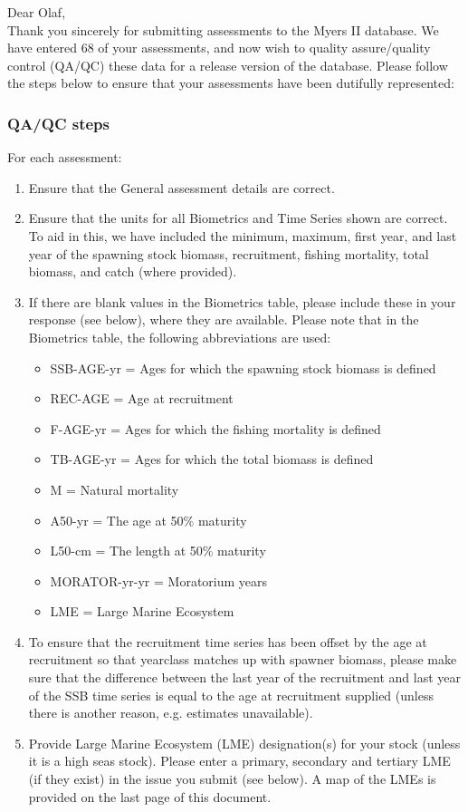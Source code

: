 \documentclass [a4paper, 10pt] {article}
\begin{document}
\noindent Dear Olaf,\\

\noindent Thank you sincerely for submitting assessments to the Myers II database. We have entered 68 of your assessments, and now wish to quality assure/quality control (QA/QC) these data for a release version of the database. Please follow the steps below to ensure that your assessments have been dutifully represented:
\subsubsection{QA/QC steps}
For each assessment:
\begin{enumerate}
\item Ensure that the General assessment details are correct.
\item Ensure that the units for all Biometrics and Time Series shown are correct. To aid in this, we have included the minimum, maximum, first year, and last year of the spawning stock biomass, recruitment, fishing mortality, total biomass, and  catch  (where provided). 
\item If there are blank values in the Biometrics table, please include these in your response (see below), where they are available.
Please note that in the Biometrics table, the following abbreviations are used:
\begin{itemize}
\item SSB-AGE-yr  = Ages for which the spawning stock biomass is defined
\item REC-AGE     = Age at recruitment
\item F-AGE-yr    = Ages for which the fishing mortality is defined 
\item TB-AGE-yr   = Ages for which the total biomass is defined
\item M      = Natural mortality
\item A50-yr      = The age at 50\% maturity
\item L50-cm      = The length at 50\% maturity
\item MORATOR-yr-yr = Moratorium years
\item LME = Large Marine Ecosystem\\
\end{itemize}
\item To ensure that the recruitment time series has been offset by the age at recruitment so that yearclass matches up with spawner biomass, please make sure that the difference between the last year of the recruitment and last year of the SSB time series is equal to the age at recruitment supplied (unless there is another reason, e.g. estimates unavailable). 
\item Provide Large Marine Ecosystem (LME) designation(s) for your stock (unless it is a high seas stock). Please enter a primary, secondary and tertiary LME (if they exist) in the issue you submit (see below). A map of the LMEs is provided on the last page of this document. 
\end{enumerate}
\vspace{-.25in}
\end{document}
